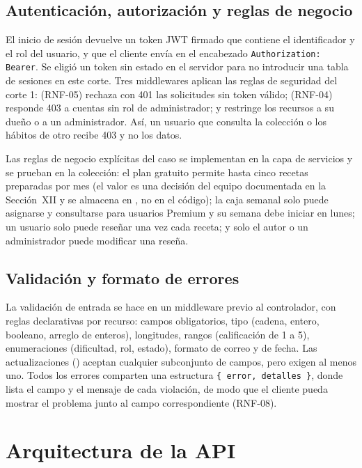 \subsection{Autenticación, autorización y reglas de negocio}
El inicio de sesión devuelve un token JWT firmado \cite{rfc7519} que contiene el identificador y el rol del usuario, y que el cliente envía en el encabezado \texttt{Authorization: Bearer}. Se eligió un token sin estado en el servidor para no introducir una tabla de sesiones en este corte. Tres middlewares aplican las reglas de seguridad del corte 1:  (RNF-05) rechaza con 401 las solicitudes sin token válido;  (RNF-04) responde 403 a cuentas sin rol de administrador; y  restringe los recursos  a su dueño o a un administrador. Así, un usuario que consulta la colección o los hábitos de otro recibe 403 y no los datos.

Las reglas de negocio explícitas del caso se implementan en la capa de servicios y se prueban en la colección: el plan gratuito permite hasta cinco recetas preparadas por mes (el valor es una decisión del equipo documentada en la Sección~XII y se almacena en , no en el código); la caja semanal solo puede asignarse y consultarse para usuarios Premium y su semana debe iniciar en lunes; un usuario solo puede reseñar una vez cada receta; y solo el autor o un administrador puede modificar una reseña.

\subsection{Validación y formato de errores}
La validación de entrada se hace en un middleware previo al controlador, con reglas declarativas por recurso: campos obligatorios, tipo (cadena, entero, booleano, arreglo de enteros), longitudes, rangos (calificación de 1 a 5), enumeraciones (dificultad, rol, estado), formato de correo y de fecha. Las actualizaciones () aceptan cualquier subconjunto de campos, pero exigen al menos uno. Todos los errores comparten una estructura \texttt{\{ error, detalles \}}, donde  lista el campo y el mensaje de cada violación, de modo que el cliente pueda mostrar el problema junto al campo correspondiente (RNF-08).

\section{Arquitectura de la API}

